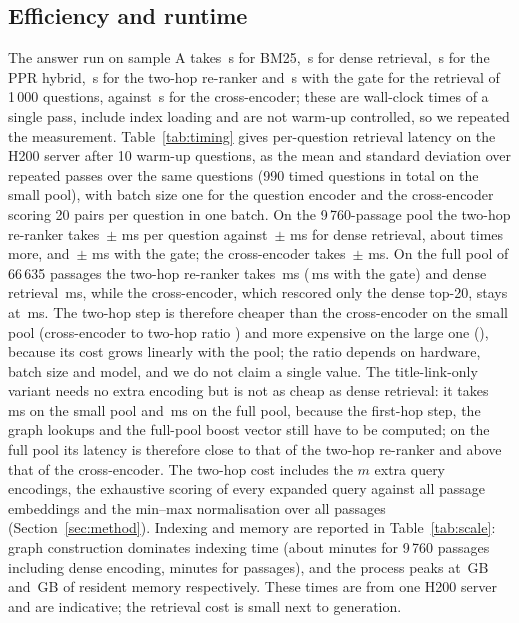 \documentclass[a4paper,fleqn]{cas-sc}
\begin{document}
\subsection{Efficiency and runtime}\label{sec:cost}

The answer run on sample A takes \RSampleABmTwoSec\,s for BM25, \RSampleADenseSec\,s for dense retrieval, \RSampleAHybridSec\,s for the PPR hybrid, \RSampleAHybridTwoSec\,s for the two-hop re-ranker and \ExtHAGateSec\,s with the gate for the retrieval of 1\,000 questions, against \ExtHACESec\,s for the cross-encoder; these are wall-clock times of a single pass, include index loading and are not warm-up controlled, so we repeated the measurement. Table~\ref{tab:timing} gives per-question retrieval latency on the H200 server after 10 warm-up questions, as the mean and standard deviation over repeated passes over the same questions (990 timed questions in total on the small pool), with batch size one for the question encoder and the cross-encoder scoring 20 pairs per question in one batch. On the 9\,760-passage pool the two-hop re-ranker takes \TmGpuSmallTwo\,$\pm$\,\TmGpuSmallTwoSd\,ms per question against \TmGpuSmallDense\,$\pm$\,\TmGpuSmallDenseSd\,ms for dense retrieval, about \TmGpuSmallSlow{} times more, and \TmGpuSmallGate\,$\pm$\,\TmGpuSmallGateSd\,ms with the gate; the cross-encoder takes \TmGpuSmallCE\,$\pm$\,\TmGpuSmallCESd\,ms. On the full pool of 66\,635 passages the two-hop re-ranker takes \TmGpuFullTwo\,ms (\TmGpuFullGate\,ms with the gate) and dense retrieval \TmGpuFullDense\,ms, while the cross-encoder, which rescored only the dense top-20, stays at \TmGpuFullCE\,ms. The two-hop step is therefore cheaper than the cross-encoder on the small pool (cross-encoder to two-hop ratio \TmGpuSmallRatio) and more expensive on the large one (\TmGpuFullRatio), because its cost grows linearly with the pool; the ratio depends on hardware, batch size and model, and we do not claim a single value. The title-link-only variant needs no extra encoding but is not as cheap as dense retrieval: it takes \TmGpuSmallTitle\,ms on the small pool and \TmGpuFullTitle\,ms on the full pool, because the first-hop step, the graph lookups and the full-pool boost vector still have to be computed; on the full pool its latency is therefore close to that of the two-hop re-ranker and above that of the cross-encoder. The two-hop cost includes the $m$ extra query encodings, the exhaustive scoring of every expanded query against all passage embeddings and the min--max normalisation over all passages (Section~\ref{sec:method}). Indexing and memory are reported in Table~\ref{tab:scale}: graph construction dominates indexing time (about \ScaleOneIndexMin{} minutes for 9\,760 passages including dense encoding, \ScaleFullIndexMin{} minutes for \ScaleFullPass{} passages), and the process peaks at \ScaleOneRSSgb\,GB and \ScaleFullRSSgb\,GB of resident memory respectively. These times are from one H200 server and are indicative; the retrieval cost is small next to generation.
\end{document}
